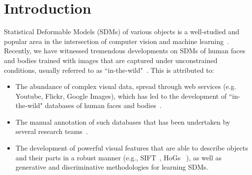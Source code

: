 

\section{Introduction}

Statistical Deformable Models (SDMs) of various objects is a well-studied and popular area in the intersection of computer vision and machine learning~\cite{Cootes1995, Cootes2001, Matthews2004, Saragih2011, Belhumeur2011, Zhu2012, Xiong2013}. Recently, we have witnessed tremendous developments on SDMs of human faces and bodies trained with images that are captured under unconstrained conditions, usually referred to as ``in-the-wild"~\cite{Belhumeur2011, Cao2012, Zhu2012, Xiong2013, Asthana2013, Tzimiropoulos2014, Asthana2014, kazemi2014one, Alabort2014, zhu2015face, antonakos2015feature, antonakos2015active, Joan_cvpr2015, tzimiropoulos2015project}. This is attributed to:
\begin{itemize}
\item The abundance of complex visual data, spread through web services (e.g. Youtube, Flickr, Google Images), which has led to the development of ``in-the-wild" databases of human faces and bodies~\cite{Belhumeur2011, Le2012, Zhu2012, Burgos2013}.

\item The manual annotation of such databases that has been undertaken by several research teams~\cite{sagonas2016faces,charles2013domain,dantone2014body,andriluka14cvpr}.

\item The development of powerful visual features that are able to describe objects and their parts in a robust manner (e.g., SIFT~\cite{lowe1999object}, HoGs~\cite{Dalal2005}
), as well as generative and discriminative methodologies for learning SDMs.
\end{itemize}

